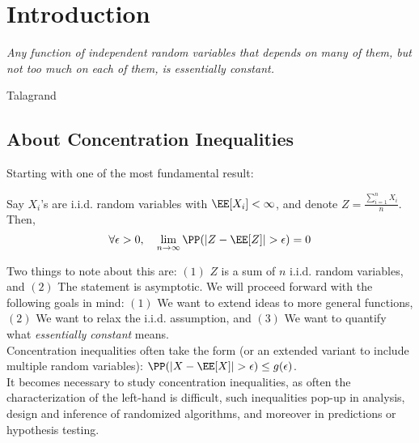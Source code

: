 \chapter{Introduction}
\setlength{\epigraphwidth}{0.7\textwidth}
\renewcommand{\epigraphflush}{center}
\epigraph{\textit{Any function of independent random variables that depends on many of them, but not too much on each of them, is essentially constant.}}{Talagrand}
\section{About Concentration Inequalities}
Starting with one of the most fundamental result:
\begin{theorem}
Say $X_i$'s are i.i.d. random variables with $\EE[X_i] < \infty$, and denote $Z = \frac{\sum_{i=1}^n X_i}{n}$. Then,
\begin{equation}\label{eq:wlln}
    \forall \epsilon > 0, \quad \lim_{n\to\infty} \PP(|Z - \EE[Z]| > \epsilon) = 0
\end{equation}
\end{theorem}
Two things to note about this are: $(1)$ $Z$ is a sum of $n$ i.i.d. random variables, and $(2)$ The statement is asymptotic. We will proceed forward with the following goals in mind: $(1)$ We want to extend ideas to more general functions, $(2)$ We want to relax the i.i.d. assumption, and $(3)$ We want to quantify what \textit{essentially constant} means. \\
Concentration inequalities often take the form (or an extended variant to include multiple random variables): $\PP(|X - \EE[X]| > \epsilon) \leq g(\epsilon)$. \\
It becomes necessary to study concentration inequalities, as often the characterization of the left-hand is difficult, such inequalities pop-up in analysis, design and inference of randomized algorithms, and moreover in predictions or hypothesis testing.
